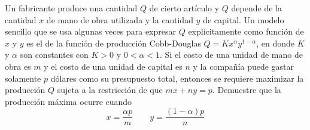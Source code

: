 \item Un fabricante produce una cantidad $Q$ de cierto artículo y $Q$ depende de la cantidad $x$ de mano de obra utilizada y la cantidad $y$ de capital. Un modelo sencillo que se usa algunas veces para expresar $Q$ explícitamente como función de $x$ y $y$ es el de la función de producción Cobb-Douglas $Q = Kx^\alpha y^{1-\alpha}$, en donde $K$ y $\alpha$ son constantes con $K > 0$ y $0 < \alpha < 1$. Si el costo de una unidad de mano de obra es $m$ y el costo de una unidad de capital es $n$ y la compañía puede gastar solamente $p$ dólares como su presupuesto total, entonces se requiere maximizar la producción $Q$ sujeta a la restricción de que $mx + ny = p$. Demuestre que la producción máxima ocurre cuando
\[ x = \frac{\alpha p}{m} \qquad y = \frac{(1-\alpha)p}{n} \]

